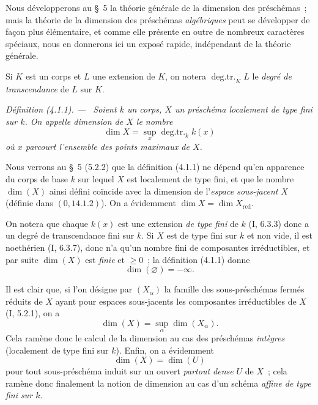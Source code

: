 \documentclass[10pt,oneside]{book}
\newenvironment{definition}[1][]{%
  \par\medskip\noindent\itshape Définition (#1). ---\ }{\par}
\begin{document}
Nous développerons au \S~5 la théorie générale de la dimension des préschémas~;
mais la théorie de la dimension des préschémas \emph{algébriques} peut se
développer de façon plus élémentaire, et comme elle présente en outre de
nombreux caractères spéciaux, nous en donnerons ici un exposé rapide,
indépendant de la théorie générale.

Si $K$ est un corps et $L$ une extension de $K$, on notera
$\operatorname{deg.tr.}_K L$ le \emph{degré de transcendance} de $L$ sur $K$.

\begin{definition}[4.1.1]
\label{IV.2.4.1.1-fr}
Soient $k$ un corps, $X$ un préschéma localement de type fini sur $k$. On
appelle \emph{dimension} de $X$ le nombre
\begin{equation}
\tag{4.1.1.1}
\label{IV.2.4.1.1.1-fr}
\dim X=\sup_x\operatorname{deg.tr.}_k k(x)
\end{equation}
où $x$ parcourt l'ensemble des points maximaux de $X$.
\end{definition}

Nous verrons au \S~5 (5.2.2) que la définition (4.1.1) ne dépend qu'en
apparence du corps de base $k$ sur lequel $X$ est localement de type fini, et
que le nombre $\dim(X)$ ainsi défini coïncide avec la dimension de
l'\emph{espace sous-jacent} $X$ (définie dans $(0,14.1.2)$). On a évidemment
$\dim X=\dim X_{\mathrm{red}}$.

On notera que chaque $k(x)$ est une extension \emph{de type fini} de $k$
(I, 6.3.3) donc a un degré de transcendance fini sur $k$. Si $X$ est de type
fini sur $k$ et non vide, il est noethérien (I, 6.3.7), donc n'a qu'un nombre
fini de composantes irréductibles, et par suite $\dim(X)$ est \emph{finie} et
$\geqslant0$~; la définition (4.1.1) donne
\[
\dim(\varnothing)=-\infty.
\]

Il est clair que, si l'on désigne par $(X_\alpha)$ la famille des
sous-préschémas fermés réduits de $X$ ayant pour espaces sous-jacents les
composantes irréductibles de $X$ (I, 5.2.1), on a
\begin{equation}
\tag{4.1.1.2}
\label{IV.2.4.1.1.2-fr}
\dim(X)=\sup_\alpha\dim(X_\alpha).
\end{equation}
Cela ramène donc le calcul de la dimension au cas des préschémas \emph{intègres}
(localement de type fini sur $k$). Enfin, on a évidemment
\begin{equation}
\tag{4.1.1.3}
\label{IV.2.4.1.1.3-fr}
\dim(X)=\dim(U)
\end{equation}
pour tout sous-préschéma induit sur un ouvert \emph{partout dense} $U$ de
$X$~; cela ramène donc finalement la notion de dimension au cas d'un schéma
\emph{affine de type fini sur $k$}.
\end{document}
